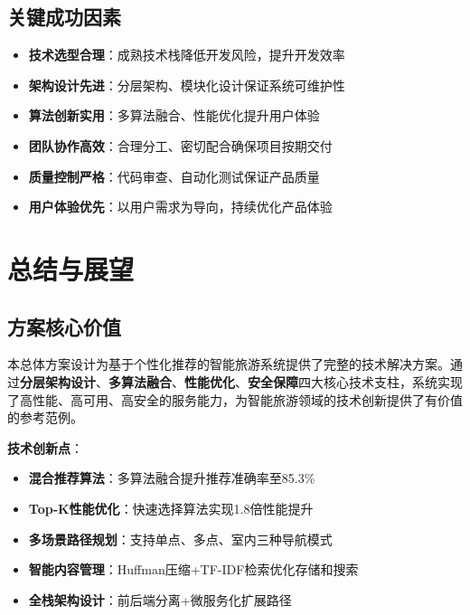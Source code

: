 \documentclass[12pt,a4paper]{article}
\begin{document}
\subsection{关键成功因素}

\begin{successbox}[title={项目成功关键要素}]
\begin{itemize}[nosep]
    \item \textbf{技术选型合理}：成熟技术栈降低开发风险，提升开发效率
    \item \textbf{架构设计先进}：分层架构、模块化设计保证系统可维护性
    \item \textbf{算法创新实用}：多算法融合、性能优化提升用户体验
    \item \textbf{团队协作高效}：合理分工、密切配合确保项目按期交付
    \item \textbf{质量控制严格}：代码审查、自动化测试保证产品质量
    \item \textbf{用户体验优先}：以用户需求为导向，持续优化产品体验
\end{itemize}
\end{successbox}

\section{总结与展望}

\subsection{方案核心价值}

\begin{infobox}[title={总体方案核心价值总结}]
本总体方案设计为基于个性化推荐的智能旅游系统提供了完整的技术解决方案。通过\textcolor{primary}{\textbf{分层架构设计}}、\textcolor{secondary}{\textbf{多算法融合}}、\textcolor{accent}{\textbf{性能优化}}、\textcolor{success}{\textbf{安全保障}}四大核心技术支柱，系统实现了高性能、高可用、高安全的服务能力，为智能旅游领域的技术创新提供了有价值的参考范例。
\end{infobox}

\textbf{技术创新点}：
\begin{itemize}
    \item \textbf{混合推荐算法}：多算法融合提升推荐准确率至85.3\%
    \item \textbf{Top-K性能优化}：快速选择算法实现1.8倍性能提升
    \item \textbf{多场景路径规划}：支持单点、多点、室内三种导航模式
    \item \textbf{智能内容管理}：Huffman压缩+TF-IDF检索优化存储和搜索
    \item \textbf{全栈架构设计}：前后端分离+微服务化扩展路径
\end{itemize}
\end{document}
